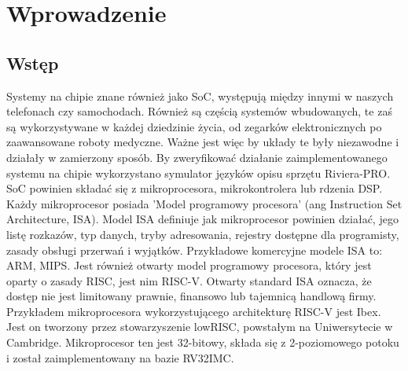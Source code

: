 \documentclass[11pt,a4paper]{article}
\begin{document}
\section{Wprowadzenie} 

	\subsection{Wstęp}
	\hspace{5mm}
Systemy na chipie znane również jako SoC, występują między innymi w naszych telefonach czy samochodach. Również są częścią systemów wbudowanych, te zaś są wykorzystywane w każdej dziedzinie życia, od zegarków elektronicznych po zaawansowane roboty medyczne. Ważne jest więc by układy te były niezawodne i działały w zamierzony sposób. By zweryfikować działanie zaimplementowanego systemu na chipie wykorzystano symulator języków opisu sprzętu Riviera-PRO.
\\
SoC powinien składać się z mikroprocesora, mikrokontrolera lub rdzenia DSP. Każdy mikroprocesor posiada 'Model programowy procesora' (ang Instruction Set Architecture, ISA). Model ISA definiuje jak mikroprocesor powinien działać, jego listę rozkazów, typ danych, tryby adresowania, rejestry dostępne dla programisty, zasady obsługi przerwań i wyjątków. Przykładowe komercyjne modele ISA to: ARM, MIPS. Jest również otwarty model programowy procesora, który jest oparty o zasady RISC, jest nim RISC-V. Otwarty standard ISA oznacza, że dostęp nie jest limitowany prawnie, finansowo lub tajemnicą handlową firmy.
\\
Przykładem mikroprocesora wykorzystującego architekturę RISC-V jest Ibex. Jest on tworzony przez stowarzyszenie lowRISC, powstałym na Uniwersytecie w Cambridge. Mikroprocesor ten jest 32-bitowy, składa się z 2-poziomowego potoku i został zaimplementowany na bazie RV32IMC.
\end{document}
